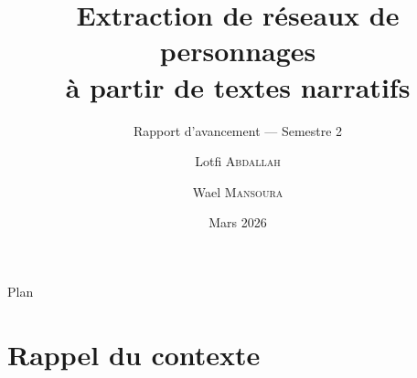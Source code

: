 \documentclass[aspectratio=169]{beamer}
\title[Réseaux de personnages --- S2]{%
  Extraction de réseaux de personnages\\[4pt]
  à partir de textes narratifs}
\subtitle{Rapport d'avancement --- Semestre 2}
\author{Lotfi \textsc{Abdallah} \and Wael \textsc{Mansoura}}
\institute[Univ. Avignon]{%
  Master 1 Informatique --- Parcours ILSEN\\
  Université d'Avignon}
\date{Mars 2026}
\begin{document}
\begin{frame}
  \titlepage
\end{frame}

\begin{frame}{Plan}
  \tableofcontents
\end{frame}

\section{Rappel du contexte}
\end{document}
